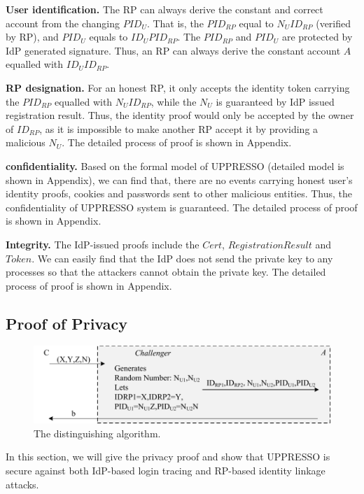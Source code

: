 \noindent\textbf{User identification.}
The RP can always derive the constant and correct account from the changing $PID_U$. That is, the $PID_{RP}$ equal to $N_UID_{RP}$ (verified by RP), and $PID_U$ equals to $ID_UPID_{RP}$. The $PID_{RP}$ and $PID_U$ are protected by IdP generated signature. Thus, an RP can always derive the constant account $A$ equalled with $ID_UID_{RP}$.

\noindent\textbf{RP designation.}
For an honest RP, it only accepts the identity token carrying the $PID_{RP}$ equalled with $N_UID_{RP}$, while the $N_U$ is guaranteed by IdP issued registration result. Thus, the identity proof would only be accepted by the owner of $ID_{RP}$, as it is impossible to make another RP accept it by providing a malicious $N_U$. The detailed process of proof is shown in Appendix.

\noindent\textbf{confidentiality.}
Based on the formal model of UPPRESSO (detailed model is shown in Appendix), we can find that, there are no events carrying honest user's identity proofs, cookies and passwords sent to other malicious entities. Thus, the confidentiality of UPPRESSO system is guaranteed. The detailed process of proof is shown in Appendix.

\noindent\textbf{Integrity.}
The IdP-issued proofs include the $Cert$, $RegistrationResult$ and $Token$. We can easily find that the IdP does not send the private key to any processes so that the attackers cannot obtain the private key. The detailed process of proof is shown in Appendix.



\subsection{Proof of Privacy}
\begin{figure}
  \centering
  \includegraphics[width=0.65\linewidth]{fig/dalgorithm.pdf}
  \caption{The distinguishing algorithm.}
  \vspace{-5mm}
  \label{fig:dalgorithm}
\end{figure}
In this section, we will give the privacy proof and show that UPPRESSO is secure against both IdP-based login tracing and RP-based identity linkage attacks.

